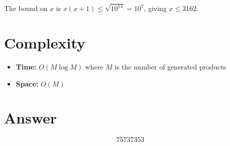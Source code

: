 \documentclass[12pt]{article}
\theoremstyle{definition}
\begin{document}
The bound on $x$ is $x(x+1) \leq \sqrt{10^{14}} = 10^7$, giving $x \leq 3162$.

\section{Complexity}
\begin{itemize}
\item \textbf{Time:} $O(M \log M)$ where $M$ is the number of generated products
\item \textbf{Space:} $O(M)$
\end{itemize}

\section{Answer}

\[
\boxed{75737353}
\]
\end{document}
